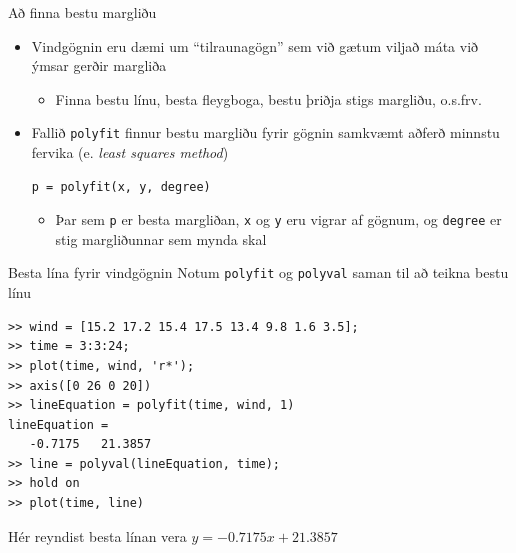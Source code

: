 \documentclass{beamer}
\begin{document}
\begin{frame}[fragile]{Að finna bestu margliðu}
\begin{itemize}
 \item Vindgögnin eru dæmi um ``tilraunagögn'' sem við gætum viljað máta við ýmsar gerðir margliða
 \begin{itemize}
  \item Finna bestu línu, besta fleygboga, bestu þriðja stigs margliðu, o.s.frv.
 \end{itemize}
 \item Fallið \texttt{polyfit} finnur bestu margliðu fyrir gögnin samkvæmt aðferð minnstu fervika (e. \emph{least squares method})
\begin{verbatim}
p = polyfit(x, y, degree)
\end{verbatim}
\begin{itemize}
 \item Þar sem \texttt{p} er besta margliðan, \texttt{x} og \texttt{y} eru vigrar af gögnum, og \texttt{degree} er stig margliðunnar sem mynda skal
\end{itemize}
\end{itemize}
\end{frame}

\begin{frame}[fragile]{Besta lína fyrir vindgögnin}
\vspace{\baselineskip}
Notum \texttt{polyfit} og \texttt{polyval} saman til að teikna bestu línu
\begin{verbatim}
>> wind = [15.2 17.2 15.4 17.5 13.4 9.8 1.6 3.5];
>> time = 3:3:24;
>> plot(time, wind, 'r*');
>> axis([0 26 0 20])
>> lineEquation = polyfit(time, wind, 1)
lineEquation =
   -0.7175   21.3857
>> line = polyval(lineEquation, time);
>> hold on
>> plot(time, line)
\end{verbatim}
Hér reyndist besta línan vera $y = -0.7175x + 21.3857$
\end{frame}
\end{document}
